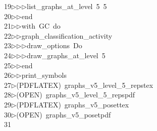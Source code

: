 \begin{tabbing}
19\>$\triangleright$\>$\triangleright$\>$\triangleright$\>list\_graphs\_at\_level\ 5\ 5\ \\[0pt]
20\>$\triangleright$\>$\triangleright$\>end\ \\[0pt]
21\>$\triangleright$\>$\triangleright$\>with\ GC\ do\ \\[0pt]
22\>$\triangleright$\>$\triangleright$\>graph\_classification\_activity\ \\[0pt]
23\>$\triangleright$\>$\triangleright$\>$\triangleright$\>draw\_options\ Do\ \\[0pt]
24\>$\triangleright$\>$\triangleright$\>$\triangleright$\>draw\_graphs\_at\_level\ 5\ \\[0pt]
25\>$\triangleright$\>$\triangleright$\>end\ \\[0pt]
26\>$\triangleright$\>$\triangleright$\>print\_symbols\\[0pt]
27\>$\triangleright$\>(PDFLATEX)\ graphs\_v5\_level\_5\_repstex\\[0pt]
28\>$\triangleright$\>(OPEN)\ graphs\_v5\_level\_5\_repspdf\\[0pt]
29\>$\triangleright$\>(PDFLATEX)\ graphs\_v5\_posettex\\[0pt]
30\>$\triangleright$\>(OPEN)\ graphs\_v5\_posetpdf\\[0pt]
31\>\end{tabbing}

